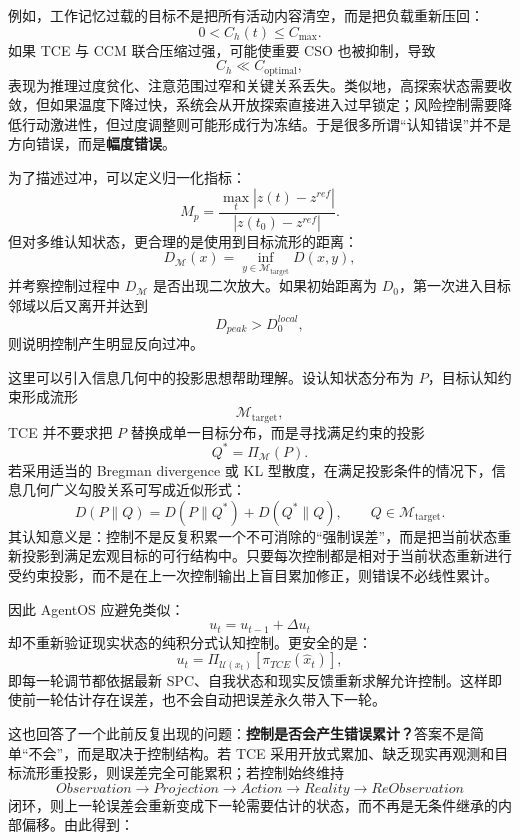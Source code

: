 例如，工作记忆过载的目标不是把所有活动内容清空，而是把负载重新压回：
\[
0<C_h(t)\le C_{\max}.
\]
如果 TCE 与 CCM 联合压缩过强，可能使重要 CSO 也被抑制，导致
\[
C_h\ll C_{\mathrm{optimal}},
\]
表现为推理过度贫化、注意范围过窄和关键关系丢失。类似地，高探索状态需要收敛，但如果温度下降过快，系统会从开放探索直接进入过早锁定；风险控制需要降低行动激进性，但过度调整则可能形成行为冻结。于是很多所谓“认知错误”并不是方向错误，而是\textbf{幅度错误}。

为了描述过冲，可以定义归一化指标：
\[
M_p
=
\frac{
\max_t |z(t)-z^{ref}|
}{
|z(t_0)-z^{ref}|
}.
\]
但对多维认知状态，更合理的是使用到目标流形的距离：
\[
D_{\mathcal M}(x)
=
\inf_{y\in\mathcal M_{\mathrm{target}}}
D(x,y),
\]
并考察控制过程中 $D_{\mathcal M}$ 是否出现二次放大。如果初始距离为 $D_0$，第一次进入目标邻域以后又离开并达到
\[
D_{peak}>D_0^{local},
\]
则说明控制产生明显反向过冲。

这里可以引入信息几何中的投影思想帮助理解。设认知状态分布为 $P$，目标认知约束形成流形
\[
\mathcal M_{\mathrm{target}},
\]
TCE 并不要求把 $P$ 替换成单一目标分布，而是寻找满足约束的投影
\[
Q^{*}
=
\Pi_{\mathcal M}(P).
\]
若采用适当的 Bregman divergence 或 KL 型散度，在满足投影条件的情况下，信息几何广义勾股关系可写成近似形式：
\[
D(P\|Q)
=
D(P\|Q^{*})
+
D(Q^{*}\|Q),
\qquad
Q\in\mathcal M_{\mathrm{target}}.
\]
其认知意义是：控制不是反复积累一个不可消除的“强制误差”，而是把当前状态重新投影到满足宏观目标的可行结构中。只要每次控制都是相对于当前状态重新进行受约束投影，而不是在上一次控制输出上盲目累加修正，则错误不必线性累计。

因此 AgentOS 应避免类似：
\[
u_t=u_{t-1}+\Delta u_t
\]
却不重新验证现实状态的纯积分式认知控制。更安全的是：
\[
u_t
=
\Pi_{\mathcal U(x_t)}
\left[
\pi_{TCE}(\hat{x}_t)
\right],
\]
即每一轮调节都依据最新 SPC、自我状态和现实反馈重新求解允许控制。这样即使前一轮估计存在误差，也不会自动把误差永久带入下一轮。

这也回答了一个此前反复出现的问题：\textbf{控制是否会产生错误累计？}答案不是简单“不会”，而是取决于控制结构。若 TCE 采用开放式累加、缺乏现实再观测和目标流形重投影，则误差完全可能累积；若控制始终维持
\[
Observation
\rightarrow
Projection
\rightarrow
Action
\rightarrow
Reality
\rightarrow
ReObservation
\]
闭环，则上一轮误差会重新变成下一轮需要估计的状态，而不再是无条件继承的内部偏移。由此得到：
\begin{statementbox}
\centering
{}
\end{statementbox}

